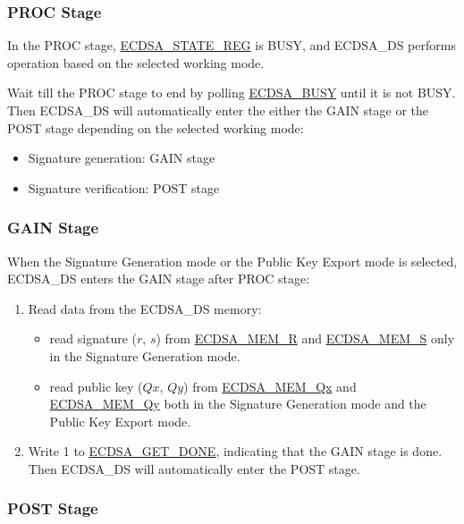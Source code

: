 \documentclass[main\_\_EN.tex]{subfiles}
\begin{document}
\subsubsection{PROC Stage}

In the PROC stage, \hyperref[regdesc:ECDSASTATEREG]{ECDSA\_STATE\_REG} is BUSY, and ECDSA\_DS performs operation based on the selected working mode.

Wait till the PROC stage to end by polling \hyperref[fielddesc:ECDSABUSY]{ECDSA\_BUSY} until it is not BUSY. Then ECDSA\_DS will automatically enter the either the GAIN stage or the POST stage depending on the selected working mode:
\begin{itemize}
    \item Signature generation: GAIN stage
    \item Signature verification: POST stage
\end{itemize}

\subsubsection{GAIN Stage}

When the Signature Generation mode or the Public Key Export mode is selected, ECDSA\_DS enters the GAIN stage after PROC stage:

\begin{enumerate}
	\item Read data from the ECDSA\_DS memory:
	      \begin{itemize}
		      \item read signature ($r$, $s$) from \hyperref[tab:ecdsa-memory]{ECDSA\_MEM\_R} and \hyperref[tab:ecdsa-memory]{ECDSA\_MEM\_S} only in the Signature Generation mode.
		      \item read public key ($Qx$, $Qy$) from \hyperref[tab:ecdsa-memory]{ECDSA\_MEM\_Qx} and \hyperref[tab:ecdsa-memory]{ECDSA\_MEM\_Qy} both in the Signature Generation mode and the Public Key Export mode.
	      \end{itemize}
	\item Write 1 to \hyperref[fielddesc:ECDSAGETDONE]{ECDSA\_GET\_DONE}, indicating that the GAIN stage is done. Then ECDSA\_DS will automatically enter the POST stage.
\end{enumerate}

\subsubsection{POST Stage}
\end{document}
